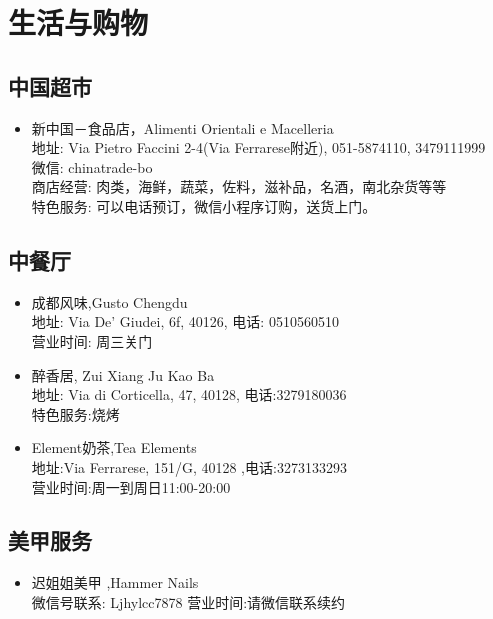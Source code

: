 \chapter{生活与购物}              



\section{中国超市}
\begin{itemize}
\item 新中国－食品店，Alimenti Orientali e Macelleria\\
地址: Via Pietro Faccini 2-4(Via Ferrarese附近), 051-5874110, 3479111999\\
微信: chinatrade-bo\\
商店经营: 肉类，海鲜，蔬菜，佐料，滋补品，名酒，南北杂货等等\\
特色服务: 可以电话预订，微信小程序订购，送货上门。
\end{itemize}

\section{中餐厅}
\begin{itemize}
\item 成都风味,Gusto Chengdu\\
地址: Via De' Giudei, 6f, 40126, 电话: 0510560510 \\
营业时间: 周三关门\\

\item 醉香居, Zui Xiang Ju Kao Ba\\
地址: Via di Corticella, 47, 40128, 电话:3279180036\\
特色服务:烧烤\\

\item Element奶茶,Tea Elements\\
地址:Via Ferrarese, 151/G, 40128 ,电话:3273133293\\
营业时间:周一到周日11:00-20:00
\end{itemize}

\section{美甲服务}
\begin{itemize}
\item 迟姐姐美甲 ,Hammer Nails\\
微信号联系: Ljhylcc7878
营业时间:请微信联系续约
\end{itemize}

